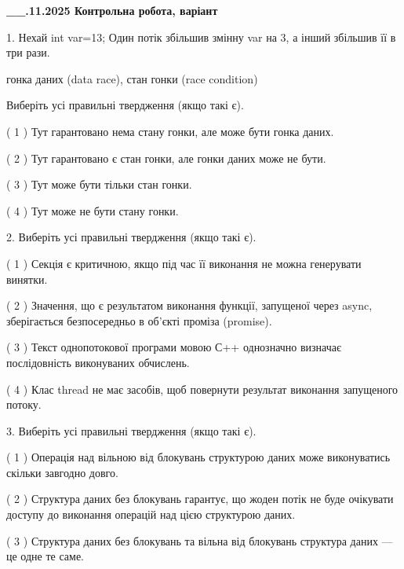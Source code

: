 \documentclass[12pt, ukrainian]{article}
\begin{document}
\newpage
\begin {large}

\textbf{\_\_.11.2025 Контрольна робота, варіант  }\par


{
1. Нехай int var=13; Один потік збільшив змінну var на 3, а інший збільшив її в три рази.

гонка даних (data race), стан гонки (race condition)

Виберіть усі правильні твердження (якщо такі є).\par
\vspace{2mm}
( 1 ) Тут гарантовано нема стану гонки, але може бути гонка даних.%

( 2 ) Тут гарантовано є стан гонки, але гонки даних може не бути.%

( 3 ) Тут може бути тільки стан гонки.%

( 4 ) Тут може не бути стану гонки.%


2. Виберіть усі правильні твердження (якщо такі є).\par
\vspace{2mm}

( 1 ) Секція є критичною, якщо під час її виконання не можна генерувати винятки.%

( 2 ) Значення, що є результатом виконання функції, запущеної через async, зберігається безпосередньо в об’єкті проміза (promise).%

( 3 ) Текст однопотокової програми мовою С++ однозначно визначає послідовність виконуваних обчислень.%

( 4 ) Клас thread не має засобів, щоб повернути результат виконання запущеного потоку.%


3. Виберіть усі правильні твердження (якщо такі є).\par
\vspace{2mm}

( 1 ) Операція над вільною від блокувань структурою даних може виконуватись скільки завгодно довго.%

( 2 ) Структура даних без блокувань гарантує, що жоден потік не буде очікувати доступу до виконання операцій над цією структурою даних.%

( 3 ) Структура даних без блокувань та вільна від блокувань структура даних --- це одне те саме.%

}
\end{large}
\end{document}
